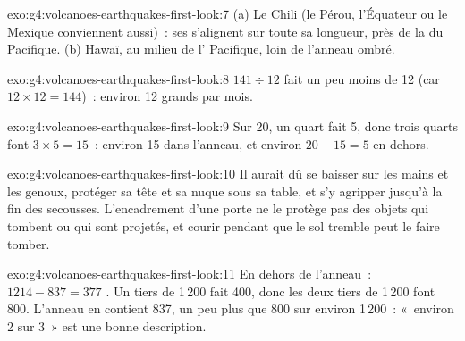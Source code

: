 \begin{solution}{exo:g4:volcanoes-earthquakes-first-look:7}
(a) Le Chili (le Pérou, l'Équateur ou le Mexique conviennent aussi)~: ses
 s'alignent sur toute sa longueur, près de la  du Pacifique.
(b) Hawaï, au milieu de l' Pacifique, loin de l'anneau ombré.
\end{solution}

\begin{solution}{exo:g4:volcanoes-earthquakes-first-look:8}
$141 \div 12$ fait un peu moins de 12 (car $12 \times 12 = 144$)~: environ
12 grands  par mois.
\end{solution}

\begin{solution}{exo:g4:volcanoes-earthquakes-first-look:9}
Sur 20, un quart fait 5, donc trois quarts font $3 \times 5 = 15$~:
environ 15 dans l'anneau, et environ $20 - 15 = 5$ en dehors.
\end{solution}

\begin{solution}{exo:g4:volcanoes-earthquakes-first-look:10}
Il aurait dû se baisser sur les mains et les genoux, protéger sa tête et sa
nuque sous sa table, et s'y agripper jusqu'à la fin des secousses.
L'encadrement d'une porte ne le protège pas des objets qui tombent ou qui
sont projetés, et courir pendant que le sol tremble peut le faire tomber.
\end{solution}

\begin{solution}{exo:g4:volcanoes-earthquakes-first-look:11}
En dehors de l'anneau~: $1214 - 837 = 377$ . Un tiers de 1\,200
fait 400, donc les deux tiers de 1\,200 font 800. L'anneau en contient 837,
un peu plus que 800 sur environ 1\,200~: «~environ 2 sur 3~» est une bonne
description.
\end{solution}
